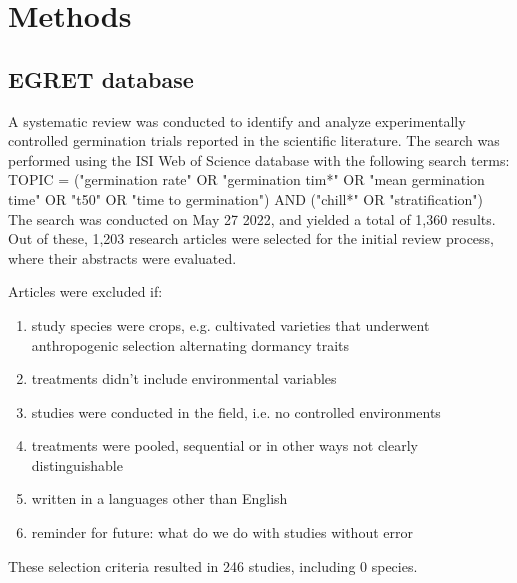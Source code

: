 \documentclass{article}
\begin{document}
\renewcommand{\bibname}{References}%




\section*{Methods} %
\subsection*{EGRET database}

A systematic review was conducted to identify and analyze experimentally controlled germination trials reported in the scientific literature. The search was performed using the ISI Web of Science database with the following search terms: \\
TOPIC = ("germination rate" OR "germination tim*" OR "mean germination time" OR "t50" OR "time to germination") AND ("chill*" OR "stratification") \\

The search was conducted on May 27 2022,%
and yielded a total of 1,360 results. Out of these, 1,203 research articles were selected for the initial review process, where their abstracts were evaluated.

Articles were excluded if:\\

\begin{enumerate}
\item study species were crops, e.g. cultivated varieties that underwent anthropogenic selection alternating dormancy traits %
\item treatments didn't include environmental variables
\item studies were conducted in the field, i.e. no controlled environments
\item treatments were pooled, sequential or in other ways not clearly distinguishable
\item written in a languages other than English %
\item reminder for future: what do we do with studies without error

\end{enumerate} 
These selection criteria resulted in 246 studies, including 0 species. %
\end{document}

